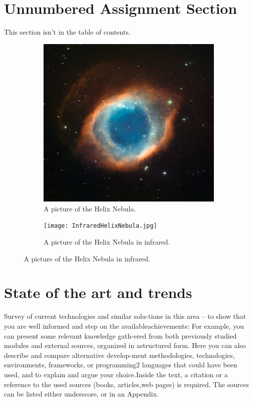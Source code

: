 \documentclass[
english, %
headsepline, %
]{scrartcl} %
\begin{document}
\section*{Unnumbered Assignment Section}
\label{sec:Unnumbered Assignment Section}
    This section isn't in the table of contents.


\begin{figure}
    \caption{A picture of the Helix Nebula.} %
    \centering %
    \begin{subfigure}[b]{0.3\textwidth}
        \includegraphics[width=\textwidth]{HelixNebula.jpg}
        \caption{A picture of the Helix Nebula.} %
        \label{fig:HelixNebula}
    \end{subfigure}
    \begin{subfigure}[b]{0.3\textwidth}
        \texttt{[image: InfraredHelixNebula.jpg]}
        \caption{A picture of the Helix Nebula in infrared.} %
        \label{fig:InfraredHelixNebula}
    \end{subfigure}
  \end{figure}

\section{State of the art and trends}
\label{sec:State of the art and trends}
    Survey of current technologies and similar solu-tions in this area – to show that you are well informed and step on the availableachievements: 
    For  example,  you  can  present  some  relevant  knowledge  gath-ered from both previously studied modules and external sources, organized in astructured form.  
    Here you can also describe and compare alternative develop-ment methodologies, technologies, environments, frameworks, or programming2
    languages  that  could  have  been  used,  and  to  explain  and  argue  your  choice.Inside the  text,  a citation or a reference  to the used  sources (books,  articles,web pages) is required.  The sources can be listed either underscore,  or in an Appendix.
\end{document}
